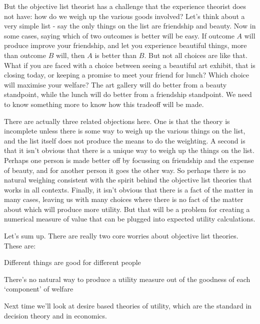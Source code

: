 But the objective list theorist has a challenge that the experience theorist does not have: how do we weigh up the various goods involved? Let's think about a very simple list - say the only things on the list are friendship and beauty. Now in some cases, saying which of two outcomes is better will be easy. If outcome $A$ will produce improve your friendship, and let you experience beautiful things, more than outcome $B$ will, then $A$ is better than $B$. But not all choices are like that. What if you are faced with a choice between seeing a beautiful art exhibit, that is closing today, or keeping a promise to meet your friend for lunch? Which choice will maximise your welfare? The art gallery will do better from a beauty standpoint, while the lunch will do better from a friendship standpoint. We need to know something more to know how this tradeoff will be made.

There are actually three related objections here. One is that the theory is incomplete unless there is some way to weigh up the various things on the list, and the list itself does not produce the means to do the weighting. A second is that it isn't obvious that there is a unique way to weigh up the things on the list. Perhaps one person is made better off by focussing on friendship and the expense of beauty, and for another person it goes the other way. So perhaps there is no natural weighing consistent with the spirit behind the objective list theories that works in all contexts. Finally, it isn't obvious that there is a fact of the matter in many cases, leaving us with many choices where there is no fact of the matter about which will produce more utility. But that will be a problem for creating a numerical measure of value that can be plugged into expected utility calculations.

Let's sum up. There are really two core worries about objective list theories. These are:
\begin{itemize*}
\item Different things are good for different people
\item There's no natural way to produce a utility measure out of the goodness of each `component' of welfare
\end{itemize*}
Next time we'll look at desire based theories of utility, which are the standard in decision theory and in economics.